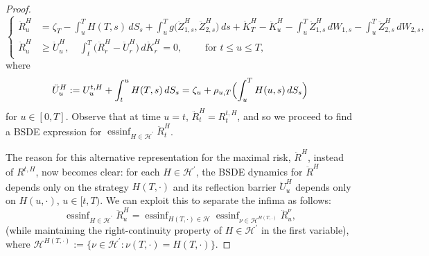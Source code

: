 \documentclass{article}
\DeclareMathOperator*{\essinf}{ess inf}
\begin{document}
\begin{proof}
\[		\left\{\begin{array}{ll}
		\ddot{R}^H_{u} &=  \zeta_T - \int_u^T H(T, s) \, dS_s +\int_u^T g\bigl(\ddot{Z}_{1,s}^{H}, \ddot{Z}_{2,s}^{H}\bigr) \, ds +\ddot{K}_{T}^H -
		\ddot{K}_{u}^H-\int_u^T \ddot{Z}^{H}_{1,s} \, dW_{1,s} - \int_u^T \ddot{Z}_{2,s}^{H} \, dW_{2,s}, \\
		\ddot{R}^H_{u} &\geq \ddot{U}_{u}^H, \quad 
		\int_t^T\bigl(\ddot{R}^H_{r} -\ddot{U}_{r}^H\bigr) \, d\ddot{K}_{r}^H=0, \qquad \text{ for }t\leq u\leq T,
		\end{array} \right.
	\]
	where
	\[
		\ddot{U}_{u}^H := U_u^{t,H} + \int_t^u H(T,s) \, dS_s =  \zeta_u +\rho_{u, T}\Bigl(\int_u^T H(u, s) \, dS_s\Bigr)
	\]
	for $u \in [0,T]$. Observe that at time $u=t$,  $\ddot{R}^H_{t} = R^{t,H}_t$, and so we proceed to find a BSDE expression for
	$\essinf_{H\in \mathcal H^\prime} \ddot{R}^H_{t}$. 

	The reason for this alternative representation for the maximal risk, $\ddot{R}^H$, instead of $R^{t,H}$, now becomes clear:  for each $H\in \mathcal H^\prime$, the 
	BSDE dynamics for $\ddot{R}^H$ depends only on the strategy $H(T, \cdot)$ and its reflection barrier $\ddot{U}_u^H$ depends only on $H(u, \cdot)$, $u\in [t, T)$. We 
	can exploit this to separate the infima as follows:
 	\begin{equation}\label{separate-inf}
		\essinf_{H\in \mathcal H^\prime}\ddot R^H_u= \essinf_{H(T, \cdot)\in \mathcal H}\essinf_{\nu \in \mathcal H^{H(T,\cdot)}} \ddot{R}^\nu_{u},
	\end{equation}
	(while maintaining the right-continuity property of  $H\in \mathcal H^\prime$ in the first variable), where
	$\mathcal H^{H(T,\cdot)}:=\{\nu\in \mathcal H^\prime: \nu(T, \cdot)=H(T, \cdot)\}$.


\end{proof}
\end{document}
